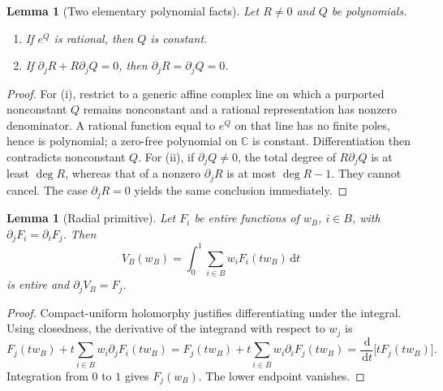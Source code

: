 \documentclass[11pt]{article}
\numberwithin{equation}{section}
\newtheorem{lemma}[theorem]{Lemma}
\theoremstyle{definition}\newtheorem{definition}[theorem]{Definition}
\theoremstyle{remark}\newtheorem{remark}[theorem]{Remark}
\newcommand{\C}{\mathbb C}
\newcommand{\dd}{\,\mathrm d}
\begin{document}
\begin{lemma}[Two elementary polynomial facts]\label{lem:elementary}
Let $R\ne0$ and $Q$ be polynomials.
\begin{enumerate}[label=(\roman*),leftmargin=*]
\item If $e^Q$ is rational, then $Q$ is constant.
\item If $\partial_jR+R\partial_jQ=0$, then
$\partial_jR=\partial_jQ=0$.
\end{enumerate}
\end{lemma}
\begin{proof}
For (i), restrict to a generic affine complex line on which a purported
nonconstant $Q$ remains nonconstant and a rational representation has
nonzero denominator. A rational function equal to $e^{Q}$ on that line
has no finite poles, hence is polynomial; a zero-free polynomial on
$\C$ is constant. Differentiation then contradicts nonconstant $Q$.
For (ii), if $\partial_jQ\ne0$, the total degree of
$R\partial_jQ$ is at least $\deg R$, whereas that of a nonzero
$\partial_jR$ is at most $\deg R-1$. They cannot cancel. The case
$\partial_jR=0$ yields the same conclusion immediately.
\end{proof}

\begin{lemma}[Radial primitive]\label{lem:radial}
Let $F_i$ be entire functions of $w_B$, $i\in B$, with
$\partial_jF_i=\partial_iF_j$. Then
\[
 V_B(w_B)=\int_0^1\sum_{i\in B}w_iF_i(tw_B)\dd t
\]
is entire and $\partial_j V_B=F_j$.
\end{lemma}
\begin{proof}
Compact-uniform holomorphy justifies differentiating under the integral.
Using closedness, the derivative of the integrand with respect to $w_j$ is
\[
 F_j(tw_B)+t\sum_{i\in B}w_i\partial_jF_i(tw_B)
 =F_j(tw_B)+t\sum_{i\in B}w_i\partial_iF_j(tw_B)
 =\frac{\dd}{\dd t}\bigl[tF_j(tw_B)\bigr].
\]
Integration from $0$ to $1$ gives $F_j(w_B)$. The lower endpoint vanishes.
\end{proof}
\end{document}
